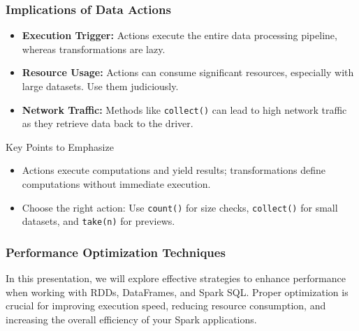 \documentclass{beamer}
\begin{document}
\begin{frame}
    \frametitle{Implications of Data Actions}
    \begin{itemize}
        \item \textbf{Execution Trigger:} Actions execute the entire data processing pipeline, whereas transformations are lazy.
        
        \item \textbf{Resource Usage:} Actions can consume significant resources, especially with large datasets. Use them judiciously.
        
        \item \textbf{Network Traffic:} Methods like \texttt{collect()} can lead to high network traffic as they retrieve data back to the driver.
    \end{itemize}
    
    \begin{block}{Key Points to Emphasize}
        \begin{itemize}
            \item Actions execute computations and yield results; transformations define computations without immediate execution.
            \item Choose the right action: Use \texttt{count()} for size checks, \texttt{collect()} for small datasets, and \texttt{take(n)} for previews.
        \end{itemize}
    \end{block}
\end{frame}

\begin{frame}
    \frametitle{Performance Optimization Techniques}
    In this presentation, we will explore effective strategies to enhance performance when working with RDDs, DataFrames, and Spark SQL. Proper optimization is crucial for improving execution speed, reducing resource consumption, and increasing the overall efficiency of your Spark applications.
\end{frame}
\end{document}
